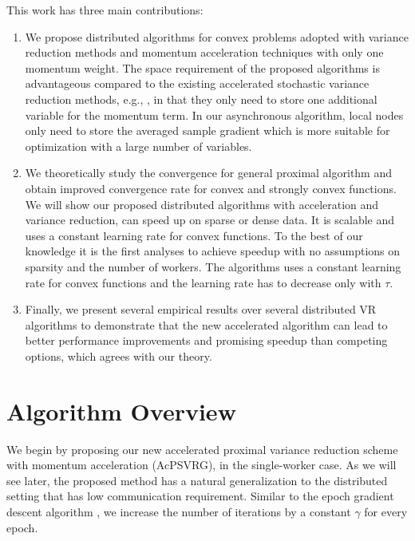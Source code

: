 This work has three main contributions:

\begin{enumerate}
    
\item We propose distributed algorithms for convex problems adopted with variance reduction methods and momentum acceleration techniques with only one momentum weight. The space requirement of the proposed algorithms is advantageous compared to the existing accelerated stochastic variance reduction methods, e.g., \cite{Allen-Zhu17,fang2018accelerating}, in that they only need to store one additional variable for the momentum term. In our asynchronous  algorithm, local nodes only need to store the averaged sample gradient which is more suitable for optimization with a
large number of variables. 

\item We theoretically study the convergence for general proximal algorithm and obtain improved convergence rate for convex and strongly convex functions. We will show our proposed distributed algorithms with acceleration and variance reduction, can speed up on sparse or dense data. It is scalable and uses a constant learning rate for convex functions. To the best of our knowledge it is the first analyses to achieve speedup with no assumptions on sparsity and the number of workers. The algorithms uses a constant learning rate for convex functions and the learning rate has to decrease only with $\tau$. 
 
\item Finally, we present several empirical results over several distributed VR algorithms to demonstrate that the new accelerated algorithm 
can lead to better performance improvements and promising speedup than competing options, which agrees with our theory. 
\end{enumerate}

\section{{Algorithm Overview}}

We begin by proposing our new accelerated proximal variance reduction scheme with momentum acceleration (AcPSVRG), in the single-worker case. 
As we will see later, the proposed method has a natural generalization to the distributed setting that has low communication requirement. Similar to the epoch gradient descent algorithm \cite{Hazan2011}, we increase the number of iterations by a constant $\gamma$ for every epoch. 

